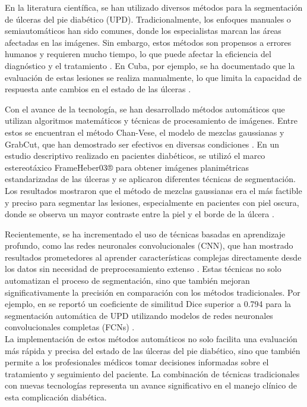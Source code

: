 \documentclass[12pt]{article}
\begin{document}
	En la literatura científica, se han utilizado diversos métodos para la segmentación de úlceras del pie diabético (UPD). Tradicionalmente, los enfoques manuales o semiautomáticos han sido comunes, donde los especialistas marcan las áreas afectadas en las imágenes. Sin embargo, estos métodos son propensos a errores humanos y requieren mucho tiempo, lo que puede afectar la eficiencia del diagnóstico y el tratamiento \cite{Heber2019}. En Cuba, por ejemplo, se ha documentado que la evaluación de estas lesiones se realiza manualmente, lo que limita la capacidad de respuesta ante cambios en el estado de las úlceras \cite{Heber2019}.
	
	Con el avance de la tecnología, se han desarrollado métodos automáticos que utilizan algoritmos matemáticos y técnicas de procesamiento de imágenes. Entre estos se encuentran el método Chan-Vese, el modelo de mezclas gaussianas y GrabCut, que han demostrado ser efectivos en diversas condiciones \cite{Gomez2019}. En un estudio descriptivo realizado en pacientes diabéticos, se utilizó el marco estereotáxico FrameHeber03® para obtener imágenes planimétricas estandarizadas de las úlceras y se aplicaron diferentes técnicas de segmentación. Los resultados mostraron que el método de mezclas gaussianas era el más factible y preciso para segmentar las lesiones, especialmente en pacientes con piel oscura, donde se observa un mayor contraste entre la piel y el borde de la úlcera \cite{Heber2019}.
	
	Recientemente, se ha incrementado el uso de técnicas basadas en aprendizaje profundo, como las redes neuronales convolucionales (CNN), que han mostrado resultados prometedores al aprender características complejas directamente desde los datos sin necesidad de preprocesamiento extenso \cite{Gomez2020}. Estas técnicas no solo automatizan el proceso de segmentación, sino que también mejoran significativamente la precisión en comparación con los métodos tradicionales. Por ejemplo, en \cite{Gomez2020} se reportó un coeficiente de similitud Dice superior a 0.794 para la segmentación automática de UPD utilizando modelos de redes neuronales convolucionales completas (FCNs) \cite{Gomez2020}.
	\\
	

	
	La implementación de estos métodos automáticos no solo facilita una evaluación más rápida y precisa del estado de las úlceras del pie diabético, sino que también permite a los profesionales médicos tomar decisiones informadas sobre el tratamiento y seguimiento del paciente. La combinación de técnicas tradicionales con nuevas tecnologías representa un avance significativo en el manejo clínico de esta complicación diabética.
	\\
		
\end{document}
